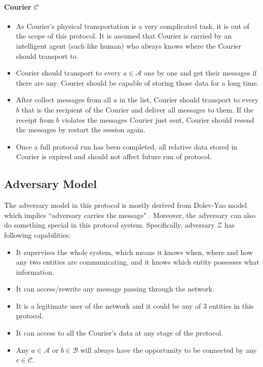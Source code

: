 \paragraph{Courier $\mathcal{C}$}
\begin{itemize}
\item As Courier's physical transportation is a very complicated task, it is out of the scope of this protocol. It is assumed that Courier is carried by an intelligent agent (such like human) who always knows where the Courier should transport to.

\item Courier should transport to every $a \in \mathcal{A}$ one by one and get their messages if there are any. Courier should be capable of storing those data for a long time.

\item After collect messages from all $a$ in the list, Courier should transport to every $b$ that is the recipient of the Courier and deliver all messages to them. If the receipt from $b$ violates the messages Courier just sent, Courier should resend the messages by restart the session again.

\item Once a full protocol run has been completed, all relative data stored in Courier is expired and should not affect future run of protocol.
\end{itemize}

\subsection*{Adversary Model}
The adversary model in this protocol is mostly derived from Dolev-Yao model which implies ``adversary carries the message" \cite{dolev}. Moreover, the adversary can also do something special in this protocol system. Specifically, adversary $\mathcal{Z}$ has following capabilities:
\begin{itemize}
\item It supervises the whole system, which means it knows when, where and how any two entities are communicating, and it knows which entity possesses what information.
\item It can access/rewrite any message passing through the network.
\item It is a legitimate user of the network and it could be any of 3 entities in this protocol.
\item It can access to all the Courier's data at any stage of the protocol.
\item Any $a \in \mathcal{A}$ or $b \in \mathcal{B}$ will always have the opportunity to be connected by any $c \in \mathcal{C}$.
\end{itemize}

